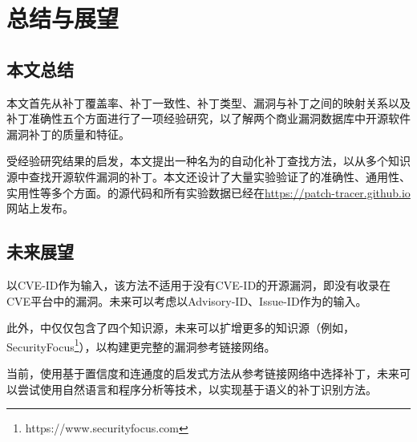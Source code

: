 \chapter{总结与展望}


\section{本文总结}
本文首先从补丁覆盖率、补丁一致性、补丁类型、漏洞与补丁之间的映射关系以及补丁准确性五个方面进行了一项经验研究，以了解两个商业漏洞数据库中开源软件漏洞补丁的质量和特征。

受经验研究结果的启发，本文提出一种名为\tool 的自动化补丁查找方法，以从多个知识源中查找开源软件漏洞的补丁。本文还设计了大量实验验证了\tool 的准确性、通用性、实用性等多个方面。\tool 的源代码和所有实验数据已经在\url{https://patch-tracer.github.io}网站上发布。

\section{未来展望}

\tool 以CVE-ID作为输入，该方法不适用于没有CVE-ID的开源漏洞，即没有收录在CVE平台中的漏洞。未来可以考虑以Advisory-ID、Issue-ID作为\tool 的输入。

此外，\tool 中仅仅包含了四个知识源，未来可以扩增更多的知识源（例如，SecurityFocus\footnote{https://www.securityfocus.com}），以构建更完整的漏洞参考链接网络。

当前，\tool 使用基于置信度和连通度的启发式方法从参考链接网络中选择补丁，未来可以尝试使用自然语言和程序分析等技术，以实现基于语义的补丁识别方法。